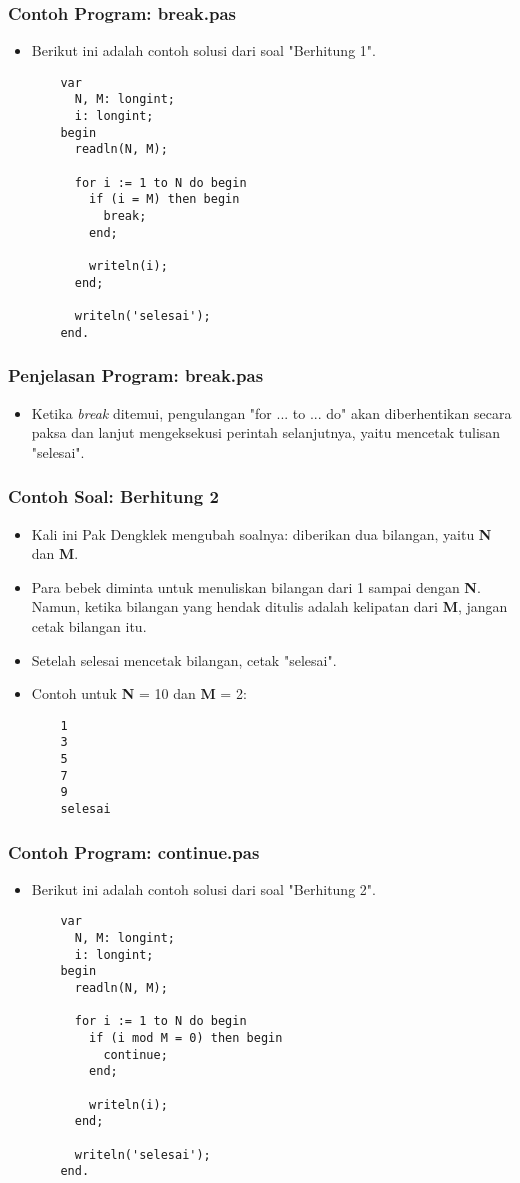 \begin{frame}[fragile]
\frametitle{Contoh Program: break.pas}
\begin{itemize}
  \item Berikut ini adalah contoh solusi dari soal "Berhitung 1".
  \begin{lstlisting}
    var
      N, M: longint;
      i: longint;
    begin
      readln(N, M);

      for i := 1 to N do begin
        if (i = M) then begin
          break;
        end;

        writeln(i);
      end;

      writeln('selesai');
    end.
  \end{lstlisting}
\end{itemize}
\end{frame}

\begin{frame}
\frametitle{Penjelasan Program: break.pas}
\begin{itemize}
  \item Ketika \textit{break} ditemui, pengulangan "for ... to ... do" akan diberhentikan secara paksa dan lanjut mengeksekusi perintah selanjutnya, yaitu mencetak tulisan "selesai".
\end{itemize}
\end{frame}

\begin{frame}[fragile]
\frametitle{Contoh Soal: Berhitung 2}
\begin{itemize}
  \item Kali ini Pak Dengklek mengubah soalnya: diberikan dua bilangan, yaitu \textbf{N} dan \textbf{M}.
  \item Para bebek diminta untuk menuliskan bilangan dari 1 sampai dengan \textbf{N}. Namun, ketika bilangan yang hendak ditulis adalah \alert{kelipatan} dari \textbf{M}, jangan cetak bilangan itu.
  \item Setelah selesai mencetak bilangan, cetak "selesai".
  \item Contoh untuk \textbf{N} = 10 dan \textbf{M} = 2:
  \begin{lstlisting}
    1
    3
    5
    7
    9
    selesai
  \end{lstlisting}
\end{itemize}
\end{frame}

\begin{frame}[fragile]
\frametitle{Contoh Program: continue.pas}
\begin{itemize}
  \item Berikut ini adalah contoh solusi dari soal "Berhitung 2".
  \begin{lstlisting}
    var
      N, M: longint;
      i: longint;
    begin
      readln(N, M);

      for i := 1 to N do begin
        if (i mod M = 0) then begin
          continue;
        end;

        writeln(i);
      end;

      writeln('selesai');
    end.
  \end{lstlisting}
\end{itemize}
\end{frame}

